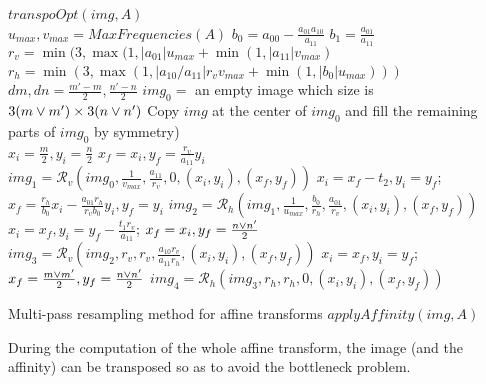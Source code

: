    \begin{algorithme}
    $transpoOpt(img,A)$\;\ \\
    $u_{max}, v_{max} = MaxFrequencies(A)$\;
	$b_0 = a_{00}-\frac{a_{01}a_{10}}{a_{11}}$\;
	$b_1 = \frac{a_{01}}{a_{11}}$\;
	$r_v = \min(3,\max (1,|a_{01}|u_{max}+\min (1,|a_{11}|v_{max})$\;
	$r_h = \min(3,\max (1,|a_{10}/a_{11}|r_vv_{max}+\min (1,|b_0|u_{max})))$\;
	\ \\
	$dm,dn = \frac{m'-m}{2},\frac{n'-n}{2}$\;
	$img_0 = $ an empty image which size is $3(m \vee m') \times 3(n \vee n')$\;
	Copy $img$ at the center of $img_0$ and fill the remaining parts of $img_0$ by symmetry)\;
	\ \\
	$x_i = \frac{m}{2}, y_i = \frac{n}{2}$\;
	$x_f = x_i, y_f = \frac{r_v}{a_{11}}y_i$\;
	$img_1 = \mathcal{R}_v(img_0,\frac{1}{v_{max}},\frac{a_{11}}{r_v},0,(x_i,y_i),(x_f,y_f))$\;
	$x_i = x_f-t_2, y_i = y_f$;
	$x_f = \frac{r_h}{b_0} x_i - \frac{a_{01}r_h}{r_v b_0} y_i, y_f = y_i$\;
	$img_2 = \mathcal{R}_h(img_1,\frac{1}{u_{max}},\frac{b_0}{r_h},\frac{a_{01}}{r_v},(x_i,y_i),(x_f,y_f))$\;
	$x_i = x_f, y_i = y_f - \frac{t_1r_v}{a_{11}}$;
	$x_f = x_i, y_f = \frac{n \vee n'}{2}$\;
	$img_3 = \mathcal{R}_v(img_2,r_v,r_v,\frac{a_{10}r_v}{a_{11}r_h},(x_i,y_i),(x_f,y_f))$\;
	$x_i = x_f, y_i = y_f$;
	$x_f = \frac{m \vee m'}{2}, y_f = \frac{n \vee n'}{2}$\;
	$img_4 = \mathcal{R}_h(img_3,r_h,r_h,0,(x_i,y_i),(x_f,y_f))$\;
    \caption{Multi-pass resampling method for affine transforms $applyAffinity(img,A)$}
    \label{algoPresqueAussiUniqueQueLesDeuxAutres}
    \label{szeliski_affine}
   \end{algorithme}
   
 During the computation of the whole affine transform, the image (and the affinity) can be transposed so as to avoid the bottleneck problem.
  
